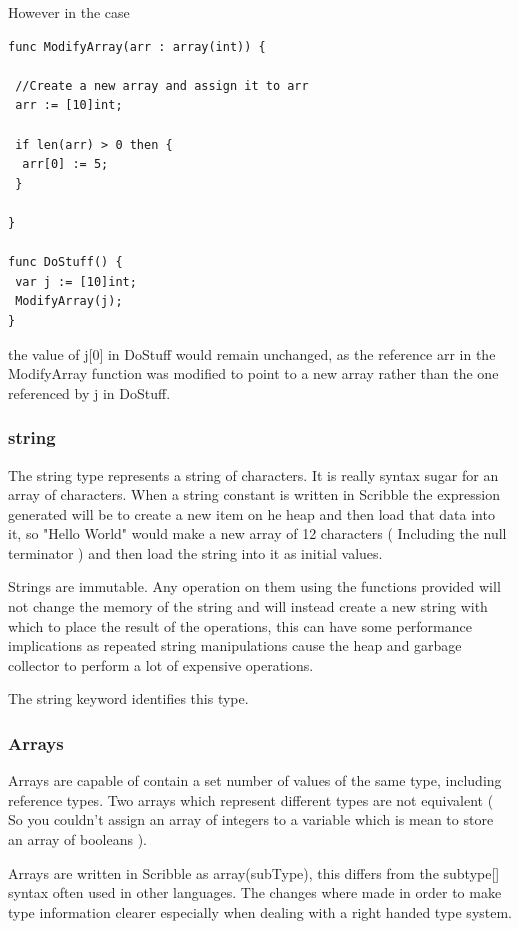 \documentclass[]{final_report}
\begin{document}
However in the case
\begin{verbatim}
func ModifyArray(arr : array(int)) {

 //Create a new array and assign it to arr
 arr := [10]int;

 if len(arr) > 0 then {
  arr[0] := 5;
 }

}

func DoStuff() {
 var j := [10]int;
 ModifyArray(j);
}
\end{verbatim}
the value of j[0] in DoStuff would remain unchanged, as the reference arr in the ModifyArray function was modified to point to a new array rather than the one referenced by j in DoStuff.

\subsubsection{string}

The string type represents a string of characters. It is really syntax sugar for an array of characters. When a string constant is written in Scribble the expression generated will be to create a new item on he heap and then load that data into it, so "Hello World" would make a new array of 12 characters ( Including the null terminator ) and then load the string into it as initial values.

Strings are immutable. Any operation on them using the functions provided will not change the memory of the string and will instead create a new string with which to place the result of the operations, this can have some performance implications as repeated string manipulations cause the heap and garbage collector to perform a lot of expensive operations.

The string keyword identifies this type.

\subsubsection{Arrays}

Arrays are capable of contain a set number of values of the same type, including reference types. Two arrays which represent different types are not equivalent ( So you couldn't assign an array of integers to a variable which is mean to store an array of booleans ).

Arrays are written in Scribble as array(subType), this differs from the subtype[] syntax often used in other languages. The changes where made in order to make type information clearer especially when dealing with a right handed type system.
\end{document}
